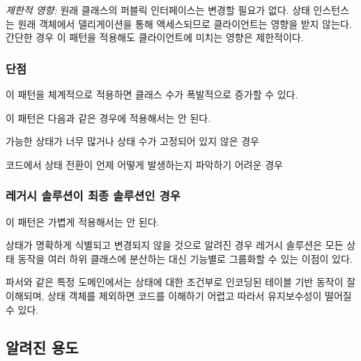 \documentclass[a4paper,10pt,twoside]{book}
\begin{document}
\begin{bulletlist}
\item \emph{제한적 영향:} 원래 클래스의 퍼블릭 인터페이스는 변경할 필요가 없다. 상태 인스턴스는 원래 객체에서 델리게이션을 통해 액세스되므로 클라이언트는 영향을 받지 않는다. 간단한 경우 이 패턴을 적용해도 클라이언트에 미치는 영향은 제한적이다.
\end{bulletlist}

\subsubsection*{단점}

\begin{bulletlist}
	\item 이 패턴을 체계적으로 적용하면 클래스 수가 폭발적으로 증가할 수 있다.

	\item 이 패턴은 다음과 같은 경우에 적용해서는 안 된다.

	\begin{bulletlist}
	\item 가능한 상태가 너무 많거나 상태 수가 고정되어 있지 않은 경우
	\item 코드에서 상태 전환이 언제 어떻게 발생하는지 파악하기 어려운 경우
	\end{bulletlist}
\end{bulletlist}

\subsubsection*{레거시 솔루션이 최종 솔루션인 경우}

이 패턴은 가볍게 적용해서는 안 된다.

\begin{bulletlist}
\item 상태가 명확하게 식별되고 변경되지 않을 것으로 알려진 경우 레거시 솔루션은 모든 상태 동작을 여러 하위 클래스에 분산하는 대신 기능별로 그룹화할 수 있는 이점이 있다.

\item 파서와 같은 특정 도메인에서는 상태에 대한 조건부로 인코딩된 테이블 기반 동작이 잘 이해되며, 상태 객체를 제외하면 코드를 이해하기 어렵고 따라서 유지보수성이 떨어질 수 있다.
\end{bulletlist}

\subsection*{알려진 용도}
\end{document}
